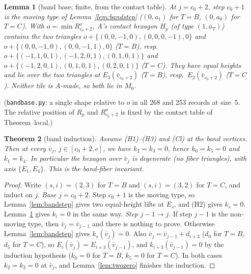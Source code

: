 \documentclass[11pt]{article}
\newtheorem{theorem}{Theorem}\newtheorem{lemma}[theorem]{Lemma}\newtheorem{proposition}[theorem]{Proposition}
\theoremstyle{definition}\newtheorem{definition}[theorem]{Definition}\newtheorem{remark}[theorem]{Remark}
\begin{document}
\begin{lemma}[band base; finite, from the contact table]\label{lem:bandbase}
At $j=c_0+2$, step $c_0+1$ is the moving type of Lemma~\ref{lem:bandstep} ($(0,a_1)$ for $T=B$, $(0,a_0)$ for $T=C$). With $o=\min R^o_{c_0+2}$, $A$'s contact hexagon $H_p$ (of type $(1,a_T)$) contains the two triangles $o+\{(0,0,-1,0),(0,0,0,-1),0\}$ and $o+\{(0,0,-1,0),(0,0,-1,1),0\}$ ($T=B$), resp.\ $o+\{(-1,1,0,1),(-1,2,0,1),(0,1,0,1)\}$ and $o+\{(-1,2,0,1),(0,1,0,1),(0,2,0,1)\}$ ($T=C$). They have equal heights and lie over the two triangles at $E_3(\bar v_{c_0+2})$ ($T=B$), resp.\ $E_2(\bar v_{c_0+2})$ ($T=C$). Neither tile is $A$-made, so both lie in $M_0$.
\end{lemma}
\noindent(\texttt{bandbase.py}: a single shape relative to $o$ in all 268 and 253 records at size~5. The relative position of $R_p$ and $R^o_{c_0+2}$ is fixed by the contact table of Theorem~local.)

\begin{theorem}[band induction]\label{thm:band}
Assume (H1)--(H3) and (Cl) at the band vertices. Then at every $\bar v_j$, $j\in[c_0+2,e]$, we have $k_2=k_3=0$, hence $k_0=k_5=0$ and $k_1=k_4$. In particular the hexagon over $\bar v_j$ is degenerate (no fiber triangles), with axis $\{E_1,E_4\}$. This is the band-fiber invariant.
\end{theorem}
\begin{proof}
Write $(s,i)=(2,3)$ for $T=B$ and $(s,i)=(3,2)$ for $T=C$, and induct on $j$.
\emph{Base $j=c_0+2$.} Step $c_0+1$ is the moving type, so Lemma~\ref{lem:bandstep} gives two equal-height lifts at $E_s$, and (H2) gives $k_s=0$. Lemma~\ref{lem:bandbase} gives $k_i=0$ in the same way.
\emph{Step $j-1\to j$.} If step $j-1$ is the non-moving type, then $\bar v_j=\bar v_{j-1}$ and there is nothing to prove. Otherwise Lemma~\ref{lem:bandstep} gives $k_s(\bar v_j)=0$. Also $\bar v_j=\bar v_{j-1}+d_{i+3}$ ($d_0$ for $T=B$, $d_5$ for $T=C$), so $E_i(\bar v_j)=E_{i+3}(\bar v_{j-1})$, and $k_{i+3}(\bar v_{j-1})=0$ by the induction hypothesis ($k_0=0$ for $T=B$, $k_5=0$ for $T=C$).
In both cases $k_2=k_3=0$ at $\bar v_j$, and Lemma~\ref{lem:twozero} finishes the induction.
\end{proof}
\end{document}
